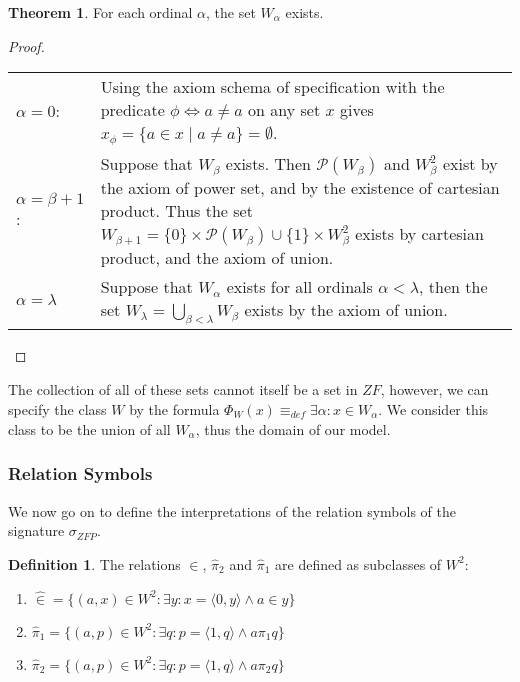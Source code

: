 \documentclass[11pt]{report}
\newcommand{\eqdef}{\equiv_\mathit{def}}
\newcommand{\pleft}{\mathrel{\pi_1}}
\newcommand{\pright}{\mathrel{\pi_2}}
\newcommand{\pair}[2]{\langle #1,#2 \rangle}
\newcommand{\zin}{\mathrel{\widehat{\in}}}
\newcommand{\zpright}{\mathrel{\widehat{\pi}_2}}
\newcommand{\zpleft}{\mathrel{\widehat{\pi}_1}}
\theoremstyle{definition}
\theoremstyle{theorem}
\theoremstyle{lemma}
\newtheorem{definition}{Definition}[section]
\newtheorem{theorem}{Theorem}[section]
\begin{document}
\begin{theorem} For each ordinal $\alpha$, the set $W_\alpha$ exists.
  \begin{proof} \hspace{1mm}\\
    \begin{tabular}{p{20mm} p{10cm}}
      $\alpha = 0$: \rule{0pt}{4ex} &
      Using the axiom schema of specification with the predicate $\phi \Leftrightarrow a \neq a$ on any set $x$ gives $x_\phi = \{a \in x \mid a \neq a \} = \emptyset$. \\
      $\alpha = \beta+1$: \rule{0pt}{4ex} &
      Suppose that $W_\beta$ exists. Then $\mathcal{P}(W_\beta)$ and $W_\beta^2$ exist by the axiom of power set, and by the existence of cartesian product. Thus the set $W_{\beta+1} = \{0\}\times\mathcal{P}(W_\beta) \cup \{1\}\times W_\beta^2$ exists by cartesian product, and the axiom of union. \\

      $\alpha = \lambda$ \rule{0pt}{4ex} &
      Suppose that $W_\alpha$ exists for all ordinals $\alpha<\lambda$, then the set $W_\lambda = \bigcup_{\beta < \lambda} W_\beta$ exists by the axiom of union.
    \end{tabular}
  \end{proof}
\end{theorem}
\noindent
The collection of all of these sets cannot itself be a set in $\mathit{ZF}$, however, we can specify the class $W$ by the formula $\Phi_W(x) \eqdef \exists \alpha: x\in W_\alpha$.
We consider this class to be the union of all $W_\alpha$, thus the domain of our model.

\subsubsection{Relation Symbols}
We now go on to define the interpretations of the relation symbols of the signature $\sigma_{\mathit{ZFP}}$.

\begin{definition} The relations $\zin$, $\zpright$ and $\zpleft$ are defined as subclasses of $W^2$:
  \begin{enumerate}[label=(\roman*)]
    \item $\zin = \{(a,x)\in W^2: \exists y: x = \pair{0}{y} \wedge a \in y\}$
    \item $\zpleft = \{(a,p)\in W^2 : \exists q: p = \pair{1}{q} \wedge a\pleft q\}$
    \item $\zpright = \{(a,p)\in W^2 : \exists q: p = \pair{1}{q} \wedge a\pright q\}$
  \end{enumerate}
\end{definition}
\end{document}
